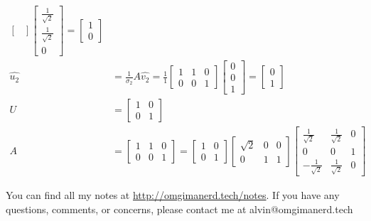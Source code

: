 \documentclass{math}
\begin{document}
\begin{align*}
\begin{bmatrix}
  \end{bmatrix}\begin{bmatrix}
    \frac{1}{\sqrt{2}} \\ \frac{1}{\sqrt{2}} \\ 0
  \end{bmatrix} = \begin{bmatrix}1 \\ 0\end{bmatrix} \\
  \hat{u_2} &= \frac{1}{\sigma_2}A\hat{v_2} = \frac{1}{1}\begin{bmatrix}
    1 & 1 & 0 \\
    0 & 0 & 1
  \end{bmatrix}\begin{bmatrix}0 \\ 0 \\ 1\end{bmatrix} = \begin{bmatrix}
    0 \\ 1
  \end{bmatrix} \\
  U &= \begin{bmatrix}
    1 & 0 \\
    0 & 1
  \end{bmatrix} \\
  A &= \begin{bmatrix}
    1 & 1 & 0 \\
    0 & 0 & 1
  \end{bmatrix} = \begin{bmatrix}
    1 & 0 \\
    0 & 1
  \end{bmatrix}\begin{bmatrix}
    \sqrt{2} & 0 & 0 \\
    0 & 1 & 1
  \end{bmatrix}\begin{bmatrix}
    \frac{1}{\sqrt{2}} & \frac{1}{\sqrt{2}} & 0 \\
    0 & 0 & 1 \\
    -\frac{1}{\sqrt{2}} & \frac{1}{\sqrt{2}} & 0
  \end{bmatrix}
\end{align*}

\begin{center}
  You can find all my notes at \url{http://omgimanerd.tech/notes}. If you have
  any questions, comments, or concerns, please contact me at
  alvin@omgimanerd.tech
\end{center}
\end{document}
